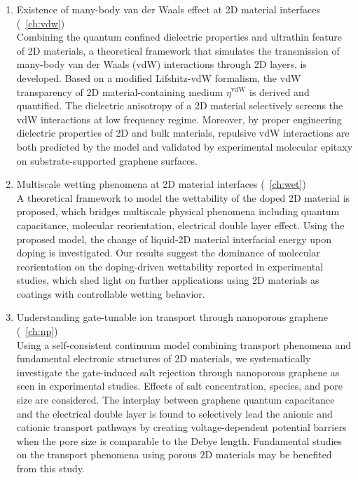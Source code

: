 \begin{enumerate}
  
\item Existence of many-body van der Waals effect at 2D material
  interfaces (~\autoref{ch:vdw})\\
  Combining the quantum confined dielectric properties and ultra\-thin
  feature of 2D materials, a theoretical framework that simulates the
  transmission of many-body van der Waals (vdW) interactions through
  2D layers, is developed. Based on a modified Lifshitz-vdW formalism,
  the vdW transparency of 2D material-containing medium
  $\eta^{\mathrm{vdW}}$ is derived and quantified.  The
  dielectric anisotropy of a 2D material selectively screens the vdW
  interactions at low frequency regime. Moreover, by proper
  engineering dielectric properties of 2D and bulk materials,
  repulsive vdW interactions are both predicted by the model and validated
  by  experimental molecular epitaxy on substrate-supported graphene surfaces.

  
\item Multiscale wetting phenomena at 2D material interfaces (~\autoref{ch:wet})\\
  A theoretical framework to model the wettability of the doped 2D
  material is proposed, which bridges multiscale physical phenomena
  including quantum capacitance, molecular reorientation, electrical
  double layer effect. Using the proposed model, the change of
  liquid-2D material interfacial energy upon doping is
  investigated. Our results suggest the dominance of molecular
  reorientation on the doping-driven wettability reported in
  experimental studies, which shed light on further applications using
  2D materials as coatings with controllable wetting behavior.

  
\item Understanding gate-tunable ion transport through nanoporous graphene (~\autoref{ch:np})\\
  Using a self-consistent continuum model combining transport
  phenomena and fundamental electronic structures of 2D materials, we
  systematically investigate the gate-induced salt rejection through
  nanoporous graphene as seen in experimental studies.  Effects of
  salt concentration, species, and pore size are considered. The
  interplay between graphene quantum capacitance and the electrical
  double layer is found to selectively lead the anionic and cationic
  transport pathways by creating voltage-dependent potential barriers
  when the pore size is comparable to the Debye length. Fundamental
  studies on the transport phenomena using porous 2D materials may be
  benefited from this study.


\end{enumerate}
